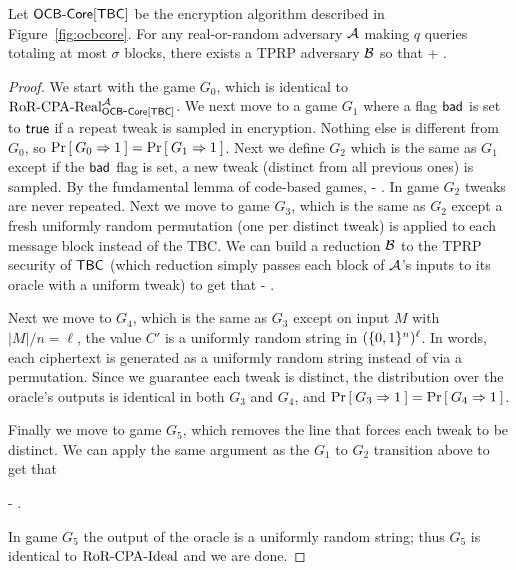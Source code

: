 \begin{theorem}
Let $\mathsf{OCB\mbox{-} Core}[\mathsf{TBC}]$ be the encryption algorithm described in Figure~\ref{fig:ocbcore}. For any real-or-random adversary ${\mathcal A}$ making $q$ queries totaling at most $\sigma$ blocks, there exists a TPRP adversary ${\mathcal B}$ so that
\bnm
\AdvROR{\ocbcore[\tbc]}{\advA} \leq \AdvTPRP{\tbc}{\advB} + \; .
\enm
\end{theorem}
\begin{proof}
We start with the game $G_0$, which is identical to $\text{RoR-CPA-Real}^{\mathcal A}_{\mathsf{OCB\mbox{-} Core}[\mathsf{TBC}]}$. We next move to a game $G_1$ where a flag $\mathsf{bad}$ is set to $\mathsf{true}$ if a repeat tweak is sampled in encryption. Nothing else is different from $G_0$, so $\Pr\left[\: G_0\Rightarrow 1 \:\right] = \Pr\left[\: G_1\Rightarrow 1 \:\right]$. Next we define $G_2$ which is the same as $G_1$ except if the $\mathsf{bad}$ flag is set, a new tweak (distinct from all previous ones) is sampled. By the fundamental lemma of code-based games, 
\bnm
\left\lvert{} - \right\rvert \leq {}\; .
\enm
In game $G_2$ tweaks are never repeated. Next we move to game $G_3$, which is the same as $G_2$ except a fresh uniformly random permutation (one per distinct tweak) is applied to each message block instead of the TBC. We can build a reduction ${\mathcal B}$ to the TPRP security of $\mathsf{TBC}$ (which reduction simply passes each block of ${\mathcal A}$'s inputs to its oracle with a uniform tweak) to get that
\bnm
\left\lvert{} - \right\rvert \leq \AdvTPRP{\tbc}{\advB}\; .
\enm

Next we move to $G_4$, which is the same as $G_3$ except on input $M$ with $|M|/n = \ell$, the value $C'$ is a uniformly random string in $(\{0,1\}^{n})^\ell$. In words, each ciphertext is generated as a uniformly random string instead of via a permutation. Since we guarantee each tweak is distinct, the distribution over the oracle's outputs is identical in both $G_3$ and $G_4$, and $\Pr\left[\: G_3\Rightarrow 1 \:\right] = \Pr\left[\: G_4\Rightarrow 1 \:\right]$. 

Finally we move to game $G_5$, which removes the line that forces each tweak to be distinct. We can apply the same argument as the $G_1$ to $G_2$ transition above to get that

\bnm
\left\lvert{} - \right\rvert \leq {}\; .
\enm

In game $G_5$ the output of the oracle is a uniformly random string; thus $G_5$ is identical to $\text{RoR-CPA-Ideal}$ and we are done.\hfill\qedsym
\end{proof}
